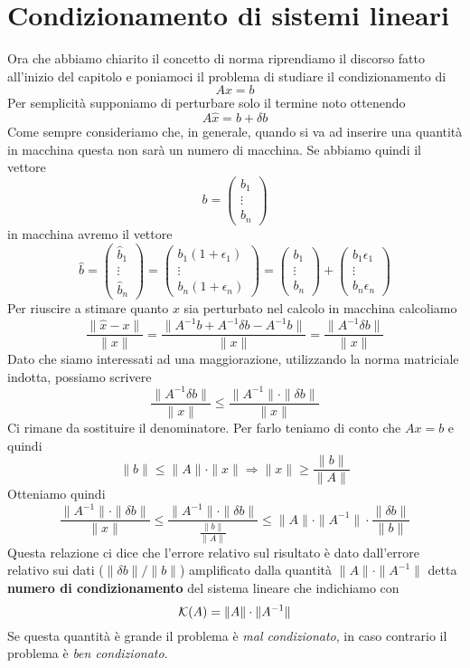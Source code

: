 \section{Condizionamento di sistemi lineari}
Ora che abbiamo chiarito il concetto di norma riprendiamo il discorso fatto all'inizio del capitolo e poniamoci
il problema di studiare il condizionamento di
\[ A x = b \]
Per semplicità supponiamo di perturbare solo il termine noto ottenendo
\[ A \hat{x} = b + \delta b \]
Come sempre consideriamo che, in generale, quando si va ad inserire una quantità in macchina questa non sarà un
numero di macchina. Se abbiamo quindi il vettore
\[ b = \begin{pmatrix} b_1 \\ \vdots \\ b_n \end{pmatrix} \]
in macchina avremo il vettore
\[
	\hat{b} = \begin{pmatrix} \hat{b}_1 \\ \vdots \\ \hat{b}_n \end{pmatrix} =
	\begin{pmatrix} b_1 (1 + \epsilon_1) \\ \vdots \\ b_n (1 + \epsilon_n)	\end{pmatrix} =
	\begin{pmatrix} b_1 \\ \vdots \\ b_n \end{pmatrix} +
	\begin{pmatrix} b_1 \epsilon_1 \\ \vdots \\ b_n \epsilon_n \end{pmatrix}
\]
Per riuscire a stimare quanto $x$ sia perturbato nel calcolo in macchina calcoliamo
\[
	\frac{\| \hat{x} - x \|}{\| x \|} =
	\frac{\| A^{-1} b + A^{-1} \delta b - A^{-1} b \|}{\| x \|} =
	\frac{\| A^{-1} \delta b \|}{\| x \|}
\]
Dato che siamo interessati ad una maggiorazione, utilizzando la norma matriciale indotta, possiamo scrivere
\[ \frac{\| A^{-1} \delta b \|}{\| x \|} \leq \frac{\| A^{-1} \| \cdot \| \delta b \|}{\| x \|} \]
Ci rimane da sostituire il denominatore. Per farlo teniamo di conto che $A x = b$ e quindi
\[ \| b \| \leq \| A \| \cdot \| x \| \Rightarrow \| x \| \geq \frac{\| b \|}{\| A \|} \]
Otteniamo quindi
\[
	\frac{\| A^{-1} \| \cdot \| \delta b \|}{\| x \|} \leq
	\frac{\| A^{-1} \| \cdot \| \delta b \|}{\frac{\| b \|}{\| A \|}} \leq
	\| A \| \cdot \| A^{-1} \| \cdot \frac{\| \delta b \|}{\| b \|}
\]
Questa relazione ci dice che l'errore relativo sul risultato è dato dall'errore relativo sui dati
($\| \delta b \| / \| b \|$) amplificato dalla quantità $\| A \| \cdot \| A^{-1} \|$ detta
\textbf{numero di condizionamento} del sistema lineare che indichiamo con
\[ \mathcal{K} (A) = \| A \| \cdot \| A^{-1} \| \]
Se questa quantità è grande il problema è \emph{mal condizionato}, in caso contrario il problema è
\emph{ben condizionato}.